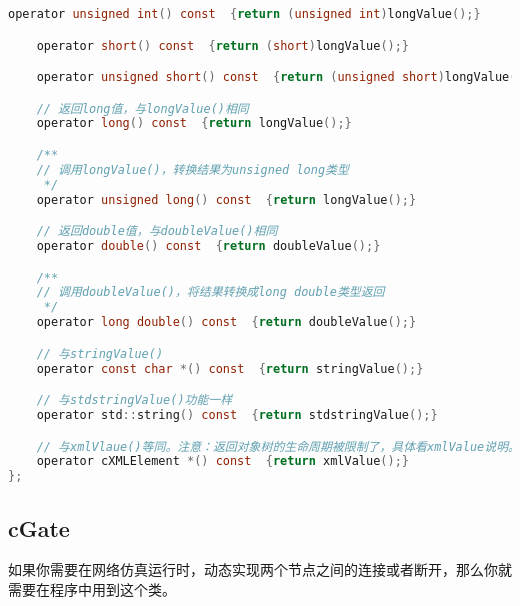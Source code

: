 \begin{lstlisting}[language=c]
    operator unsigned int() const  {return (unsigned int)longValue();}

    operator short() const  {return (short)longValue();}

    operator unsigned short() const  {return (unsigned short)longValue();}

    // 返回long值，与longValue()相同
    operator long() const  {return longValue();}

    /**
    // 调用longValue()，转换结果为unsigned long类型
     */
    operator unsigned long() const  {return longValue();}

    // 返回double值，与doubleValue()相同
    operator double() const  {return doubleValue();}

    /**
    // 调用doubleValue()，将结果转换成long double类型返回
     */
    operator long double() const  {return doubleValue();}

    // 与stringValue()
    operator const char *() const  {return stringValue();}

    // 与stdstringValue()功能一样
    operator std::string() const  {return stdstringValue();}

    // 与xmlVlaue()等同。注意：返回对象树的生命周期被限制了，具体看xmlValue说明。
    operator cXMLElement *() const  {return xmlValue();}
};
\end{lstlisting}

\subsection{cGate}
\label{cgate}

如果你需要在网络仿真运行时，动态实现两个节点之间的连接或者断开，那么你就需要在程序中用到这个类。

